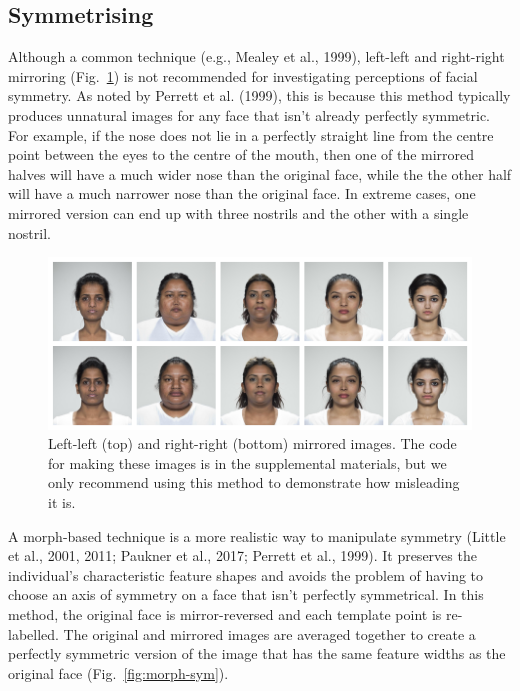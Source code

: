 \documentclass[
  man,floatsintext]{apa6}
\begin{document}
\hypertarget{symmetrising}{%
\subsection{Symmetrising}\label{symmetrising}}

Although a common technique (e.g., Mealey et al., 1999), left-left and right-right mirroring (Fig.~\ref{fig:mirror-sym}) is not recommended for investigating perceptions of facial symmetry. As noted by Perrett et al. (1999), this is because this method typically produces unnatural images for any face that isn't already perfectly symmetric. For example, if the nose does not lie in a perfectly straight line from the centre point between the eyes to the centre of the mouth, then one of the mirrored halves will have a much wider nose than the original face, while the the other half will have a much narrower nose than the original face. In extreme cases, one mirrored version can end up with three nostrils and the other with a single nostril.

\begin{figure}
\includegraphics[width=1\linewidth]{index_files/figure-latex/mirror-sym-1} \caption{Left-left (top) and right-right (bottom) mirrored images. The code for making these images is in the supplemental materials, but we only recommend using this method to demonstrate how misleading it is.}\label{fig:mirror-sym}
\end{figure}

A morph-based technique is a more realistic way to manipulate symmetry (Little et al., 2001, 2011; Paukner et al., 2017; Perrett et al., 1999). It preserves the individual's characteristic feature shapes and avoids the problem of having to choose an axis of symmetry on a face that isn't perfectly symmetrical. In this method, the original face is mirror-reversed and each template point is re-labelled. The original and mirrored images are averaged together to create a perfectly symmetric version of the image that has the same feature widths as the original face (Fig.~\ref{fig:morph-sym}).
\end{document}
